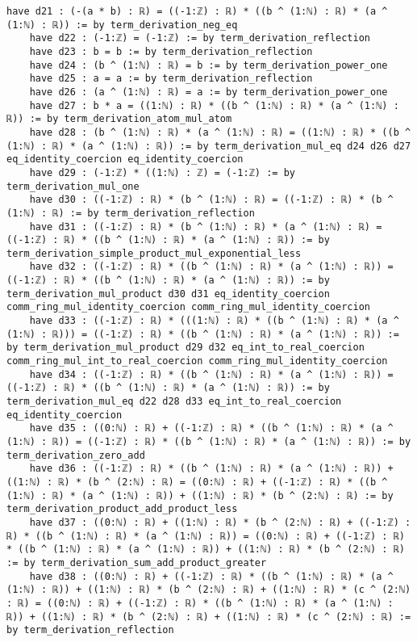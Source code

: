 \documentclass{article}
\begin{document}
\begin{tcolorbox}[colback=white!10, width=\linewidth]
\begin{lstlisting}[language=Lean4]
    have d21 : (-(a * b) : ℝ) = ((-1:ℤ) : ℝ) * ((b ^ (1:ℕ) : ℝ) * (a ^ (1:ℕ) : ℝ)) := by term_derivation_neg_eq
    have d22 : (-1:ℤ) = (-1:ℤ) := by term_derivation_reflection
    have d23 : b = b := by term_derivation_reflection
    have d24 : (b ^ (1:ℕ) : ℝ) = b := by term_derivation_power_one
    have d25 : a = a := by term_derivation_reflection
    have d26 : (a ^ (1:ℕ) : ℝ) = a := by term_derivation_power_one
    have d27 : b * a = ((1:ℕ) : ℝ) * ((b ^ (1:ℕ) : ℝ) * (a ^ (1:ℕ) : ℝ)) := by term_derivation_atom_mul_atom
    have d28 : (b ^ (1:ℕ) : ℝ) * (a ^ (1:ℕ) : ℝ) = ((1:ℕ) : ℝ) * ((b ^ (1:ℕ) : ℝ) * (a ^ (1:ℕ) : ℝ)) := by term_derivation_mul_eq d24 d26 d27 eq_identity_coercion eq_identity_coercion
    have d29 : (-1:ℤ) * ((1:ℕ) : ℤ) = (-1:ℤ) := by term_derivation_mul_one
    have d30 : ((-1:ℤ) : ℝ) * (b ^ (1:ℕ) : ℝ) = ((-1:ℤ) : ℝ) * (b ^ (1:ℕ) : ℝ) := by term_derivation_reflection
    have d31 : ((-1:ℤ) : ℝ) * (b ^ (1:ℕ) : ℝ) * (a ^ (1:ℕ) : ℝ) = ((-1:ℤ) : ℝ) * ((b ^ (1:ℕ) : ℝ) * (a ^ (1:ℕ) : ℝ)) := by term_derivation_simple_product_mul_exponential_less
    have d32 : ((-1:ℤ) : ℝ) * ((b ^ (1:ℕ) : ℝ) * (a ^ (1:ℕ) : ℝ)) = ((-1:ℤ) : ℝ) * ((b ^ (1:ℕ) : ℝ) * (a ^ (1:ℕ) : ℝ)) := by term_derivation_mul_product d30 d31 eq_identity_coercion comm_ring_mul_identity_coercion comm_ring_mul_identity_coercion
    have d33 : ((-1:ℤ) : ℝ) * (((1:ℕ) : ℝ) * ((b ^ (1:ℕ) : ℝ) * (a ^ (1:ℕ) : ℝ))) = ((-1:ℤ) : ℝ) * ((b ^ (1:ℕ) : ℝ) * (a ^ (1:ℕ) : ℝ)) := by term_derivation_mul_product d29 d32 eq_int_to_real_coercion comm_ring_mul_int_to_real_coercion comm_ring_mul_identity_coercion
    have d34 : ((-1:ℤ) : ℝ) * ((b ^ (1:ℕ) : ℝ) * (a ^ (1:ℕ) : ℝ)) = ((-1:ℤ) : ℝ) * ((b ^ (1:ℕ) : ℝ) * (a ^ (1:ℕ) : ℝ)) := by term_derivation_mul_eq d22 d28 d33 eq_int_to_real_coercion eq_identity_coercion
    have d35 : ((0:ℕ) : ℝ) + ((-1:ℤ) : ℝ) * ((b ^ (1:ℕ) : ℝ) * (a ^ (1:ℕ) : ℝ)) = ((-1:ℤ) : ℝ) * ((b ^ (1:ℕ) : ℝ) * (a ^ (1:ℕ) : ℝ)) := by term_derivation_zero_add
    have d36 : ((-1:ℤ) : ℝ) * ((b ^ (1:ℕ) : ℝ) * (a ^ (1:ℕ) : ℝ)) + ((1:ℕ) : ℝ) * (b ^ (2:ℕ) : ℝ) = ((0:ℕ) : ℝ) + ((-1:ℤ) : ℝ) * ((b ^ (1:ℕ) : ℝ) * (a ^ (1:ℕ) : ℝ)) + ((1:ℕ) : ℝ) * (b ^ (2:ℕ) : ℝ) := by term_derivation_product_add_product_less
    have d37 : ((0:ℕ) : ℝ) + ((1:ℕ) : ℝ) * (b ^ (2:ℕ) : ℝ) + ((-1:ℤ) : ℝ) * ((b ^ (1:ℕ) : ℝ) * (a ^ (1:ℕ) : ℝ)) = ((0:ℕ) : ℝ) + ((-1:ℤ) : ℝ) * ((b ^ (1:ℕ) : ℝ) * (a ^ (1:ℕ) : ℝ)) + ((1:ℕ) : ℝ) * (b ^ (2:ℕ) : ℝ) := by term_derivation_sum_add_product_greater
    have d38 : ((0:ℕ) : ℝ) + ((-1:ℤ) : ℝ) * ((b ^ (1:ℕ) : ℝ) * (a ^ (1:ℕ) : ℝ)) + ((1:ℕ) : ℝ) * (b ^ (2:ℕ) : ℝ) + ((1:ℕ) : ℝ) * (c ^ (2:ℕ) : ℝ) = ((0:ℕ) : ℝ) + ((-1:ℤ) : ℝ) * ((b ^ (1:ℕ) : ℝ) * (a ^ (1:ℕ) : ℝ)) + ((1:ℕ) : ℝ) * (b ^ (2:ℕ) : ℝ) + ((1:ℕ) : ℝ) * (c ^ (2:ℕ) : ℝ) := by term_derivation_reflection

\end{lstlisting}
\end{tcolorbox}
\end{document}

